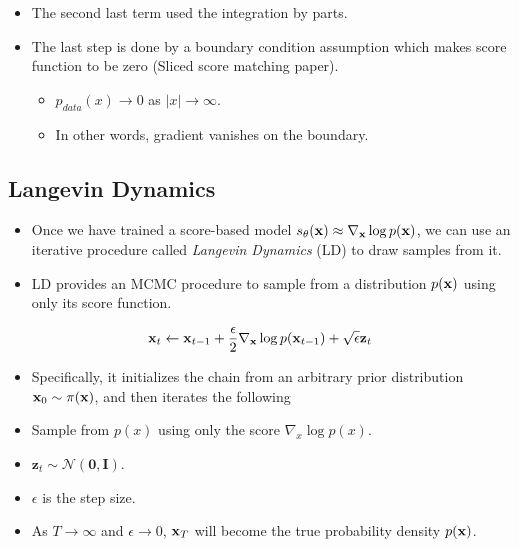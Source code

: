 \begin{itemize}
	\item The second last term used the integration by parts.
	\item The last step is done by a boundary condition assumption which makes score function to be zero (\cf Sliced score matching paper).
		\begin{itemize}
			\item $p_{data}(x)\to 0$ as $|x|\to \infty$.
			\item In other words, gradient vanishes on the boundary. 
		\end{itemize}
\end{itemize}

\subsection{Langevin Dynamics}
\begin{itemize}
	\item Once we have trained a score-based model $s_\theta({\mathbf{x}})\approx \nabla_{\mathbf{x}}\log p(\mathbf{x})$, we can use an iterative procedure called \textit{Langevin Dynamics} (LD) \cite{sgld2011} to draw samples from it.
	\item LD provides an MCMC procedure to sample from a distribution $p({\mathbf{x}})$ using only its score function.
\end{itemize}

	$$ \mathbf{x}_t \leftarrow \mathbf{x}_{t-1} + \frac{\epsilon}{2} \nabla_{\mathbf{x}}\log p(\mathbf{x}_{t-1}) + \sqrt{\epsilon} \mathbf{z}_t$$
\begin{itemize}
	\item Specifically, it initializes the chain from an arbitrary prior distribution ${\mathbf{x}}_0\sim \pi({\mathbf{x}})$, and then iterates the following
	\item Sample from $p(x)$ using only the score $\nabla_x\log p(x)$.
	\item $\mathbf{z}_t \sim \mathcal{N}(\mathbf{0},\mathbf{I})$.
	\item $\epsilon$ is the step size.
\item As $T\to \infty$ and $\epsilon\to 0$, ${\mathbf{x}}_T$ will become the true probability density $p({\mathbf{x}})$.
\end{itemize}
